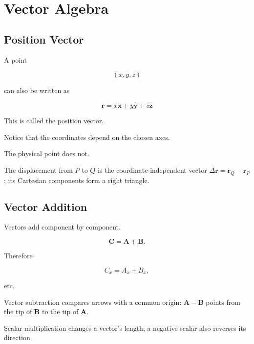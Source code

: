 \section{Vector Algebra}
\label{sec:vector-algebra}

\subsection{Position Vector}

A point

\[
(x,y,z)
\]

can also be written as

\[
\boxed{
	\mathbf r
	=
	x\hat{\mathbf x}
	+
	y\hat{\mathbf y}
	+
	z\hat{\mathbf z}
}
\]

This is called the position vector.

Notice that the coordinates depend on the chosen axes.

The physical point does not.

\begin{bookfigure}{The displacement from $P$ to $Q$ is the coordinate-independent vector $\Delta\mathbf r=\mathbf r_Q-\mathbf r_P$; its Cartesian components form a right triangle.}

\label{fig:distance-between-points}
\end{bookfigure}


\subsection{Vector Addition}

Vectors add component by component.

\[
\mathbf C
=
\mathbf A+\mathbf B.
\]

Therefore

\[
C_x=A_x+B_x,
\]

etc.

\begin{bookfigure}{Vector subtraction compares arrows with a common origin: $\mathbf A-\mathbf B$ points from the tip of $\mathbf B$ to the tip of $\mathbf A$.}

\label{fig:vector-subtraction}
\end{bookfigure}

\begin{bookfigure}{Scalar multiplication changes a vector's length; a negative scalar also reverses its direction.}

\label{fig:scalar-multiplication}
\end{bookfigure}

